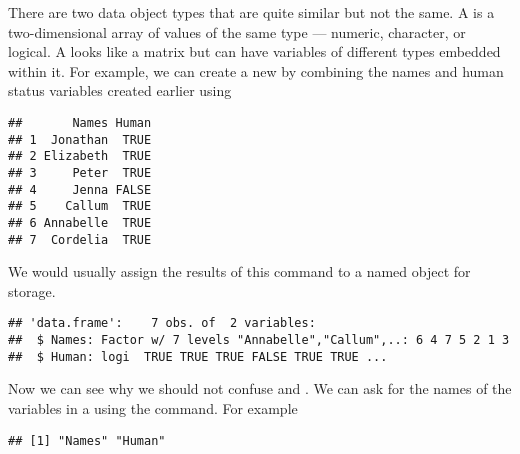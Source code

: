 There are two data object types that are quite similar but not the same. A  is a two-dimensional array of values of the same type --- numeric, character, or logical. A  looks like a matrix but can have variables of different types embedded within it. For example, we can create a new  by combining the names and human status variables created earlier using 
\begin{knitrout}
\color{fgcolor}\begin{kframe}
\begin{alltt}
\end{alltt}
\begin{verbatim}
##       Names Human
## 1  Jonathan  TRUE
## 2 Elizabeth  TRUE
## 3     Peter  TRUE
## 4     Jenna FALSE
## 5    Callum  TRUE
## 6 Annabelle  TRUE
## 7  Cordelia  TRUE
\end{verbatim}
\end{kframe}
\end{knitrout}
We would usually assign the results of this command to a named object for storage. 
\begin{knitrout}
\color{fgcolor}\begin{kframe}
\begin{alltt}
 \hlkwb{=} 
\end{alltt}
\begin{verbatim}
## 'data.frame':	7 obs. of  2 variables:
##  $ Names: Factor w/ 7 levels "Annabelle","Callum",..: 6 4 7 5 2 1 3
##  $ Human: logi  TRUE TRUE TRUE FALSE TRUE TRUE ...
\end{verbatim}
\end{kframe}
\end{knitrout}
 
Now we can see why we should not confuse  and . We can ask for the names of the variables in a  using the  command. For example 
\begin{knitrout}
\color{fgcolor}\begin{kframe}
\begin{alltt}
\end{alltt}
\begin{verbatim}
## [1] "Names" "Human"
\end{verbatim}
\end{kframe}
\end{knitrout}
 
